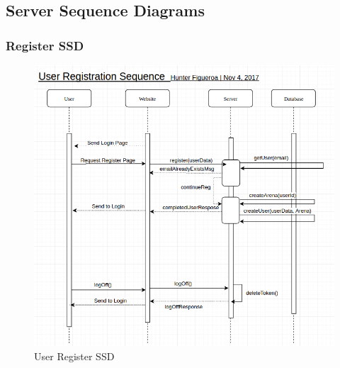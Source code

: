 \documentclass[12pt,a4paper]{report}
\begin{document}
		
		
	\subsection{Server Sequence Diagrams}
	
	\subsubsection {Register SSD}
	\begin{figure}[H]
		\centering
		\centerline{\includegraphics[scale=.7, angle=90]{ssd_register}}
		\caption{User Register SSD}
		\label{fig: User Register SSD }
	\end{figure}
	
	\newpage
\end{document}
